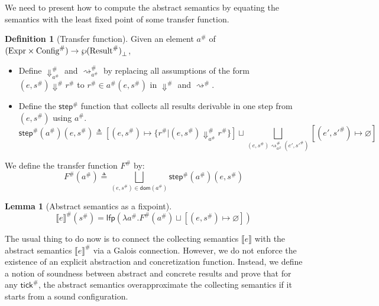 \documentclass[acmsmall,screen]{acmart}
\theoremstyle{definition}
\newtheorem{definition}{Definition}[section]
\newtheorem{lem}{Lemma}[section]
\newcommand*{\A}[1]{{#1}^{\#}}
\newcommand*{\Expr}{\text{Expr}}
\newcommand*{\Time}{\mathbb{T}}
\newcommand*{\ATime}{\A{\Time}}
\newcommand*{\AConfig}[1]{\A{\text{Config}}\vphantom{#1}}
\newcommand*{\AResult}[1]{\A{\text{Result}}\vphantom{#1}}
\newcommand*{\sembracket}[1]{\lBrack{#1}\rBrack}
\newcommand*{\tick}{\mathsf{tick}}
\begin{document}
We need to present how to compute the abstract semantics by equating the semantics with the least fixed point of some transfer function.

\begin{definition}[Transfer function]
  Given an element $\A{a}$ of $(\Expr\times\AConfig{\ATime})\rightarrow{\wp(\AResult{\ATime})}_{\bot}$,

  \begin{itemize}
    \item Define $\A{\Downarrow}_{\A{a}}$ and $\A{\rightsquigarrow}_{\A{a}}$ by replacing all assumptions of the form $(e,\A{s})\A\Downarrow\A{r}$ to $\A{r}\in\A{a}(e,\A{s})$ in $\A\Downarrow$ and $\A\rightsquigarrow$.
    \item Define the $\A{\mathsf{step}}$ function that collects all results derivable in one step from $(e,\A{s})$ using $\A{a}$.
          \[
            \A{\mathsf{step}}(\A{a})(e,\A{s})\triangleq
            [(e,\A{s})\mapsto\{\A{r}|(e,\A{s})\A{\Downarrow}_{\A{a}}\A{r}\}]
            \sqcup
            \bigsqcup_{(e,\A{s})\A{\rightsquigarrow}_{\A{a}}(e',\A{s'})}[(e',\A{s'})\mapsto\varnothing]
          \]
  \end{itemize}

  We define the transfer function $\A{F}$ by:
  \[
    \A{F}(\A{a})\triangleq
    \bigsqcup_{(e,\A{s})\in\mathsf{dom}(\A{a})}
    {\A{\mathsf{step}}(\A{a})(e,\A{s})}
  \]
\end{definition}

\begin{lem}[Abstract semantics as a fixpoint]
  \[
    \A{\sembracket{e}}(\A{s})=\mathsf{lfp}(\lambda \A{a}.\A{F}(\A{a})\sqcup[(e,\A{s})\mapsto\varnothing])
  \]
\end{lem}

The usual thing to do now is to connect the collecting semantics $\sembracket{e}$ with the abstract semantics $\A{\sembracket{e}}$ via a Galois connection.
However, we do not enforce the existence of an explicit abstraction and concretization function.
Instead, we define a notion of soundness between abstract and concrete results and prove that for any $\A{\tick}$, the abstract semantics overapproximate the collecting semantics if it starts from a sound configuration.
\end{document}
